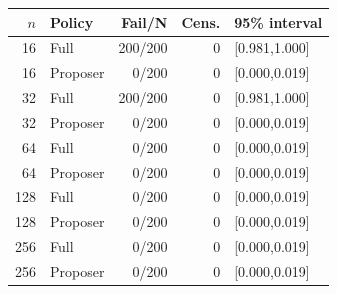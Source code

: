 \begin{tabular}{rlrrl}
\toprule
$n$ & Policy & Fail/N & Cens. & 95\% interval \\
\midrule
16 & Full & 200/200 & 0 & [0.981,1.000] \\
16 & Proposer & 0/200 & 0 & [0.000,0.019] \\
32 & Full & 200/200 & 0 & [0.981,1.000] \\
32 & Proposer & 0/200 & 0 & [0.000,0.019] \\
64 & Full & 0/200 & 0 & [0.000,0.019] \\
64 & Proposer & 0/200 & 0 & [0.000,0.019] \\
128 & Full & 0/200 & 0 & [0.000,0.019] \\
128 & Proposer & 0/200 & 0 & [0.000,0.019] \\
256 & Full & 0/200 & 0 & [0.000,0.019] \\
256 & Proposer & 0/200 & 0 & [0.000,0.019] \\
\bottomrule
\end{tabular}